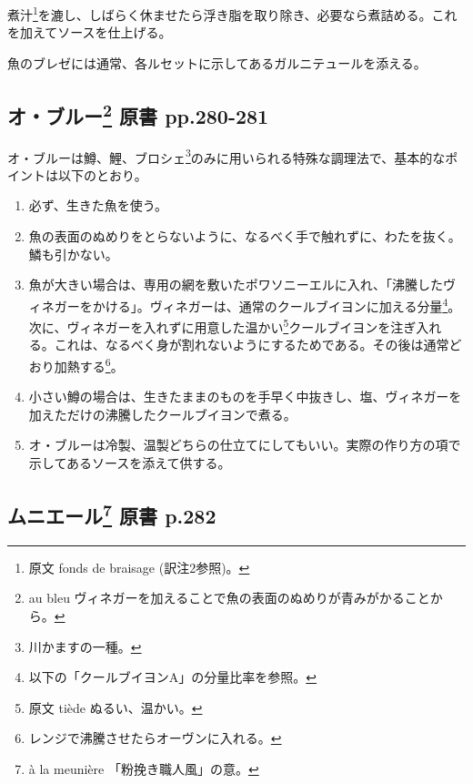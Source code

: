 煮汁\footnote{原文 fonds de braisage (訳注2参照)。}を漉し、しばらく休ませたら浮き脂を取り除き、必要なら煮詰める。これを加えてソースを仕上げる。

魚のブレゼには通常、各ルセットに示してあるガルニテュールを添える。

\hypertarget{ux30aaux30d6ux30ebux30fc36-ux539fux66f8-pp.280-281}{%
\subsection[オ・ブルー 原書
pp.280-281]{\texorpdfstring{オ・ブルー\footnote{au bleu
  ヴィネガーを加えることで魚の表面のぬめりが青みがかることから。} 原書
pp.280-281}{オ・ブルー 原書 pp.280-281}}\label{ux30aaux30d6ux30ebux30fc36-ux539fux66f8-pp.280-281}}

オ・ブルーは鱒、鯉、ブロシェ\footnote{川かますの一種。}のみに用いられる特殊な調理法で、基本的なポイントは以下のとおり。

\begin{enumerate}
\def\labelenumi{\arabic{enumi}.}
\item
  必ず、生きた魚を使う。
\item
  魚の表面のぬめりをとらないように、なるべく手で触れずに、わたを抜く。鱗も引かない。
\item
  魚が大きい場合は、専用の網を敷いたポワソニーエルに入れ、「沸騰したヴィネガーをかける」。ヴィネガーは、通常のクールブイヨンに加える分量\footnote{以下の「クールブイヨンA」の分量比率を参照。}。次に、ヴィネガーを入れずに用意した温かい\footnote{原文
    tiède ぬるい、温かい。}クールブイヨンを注ぎ入れる。これは、なるべく身が割れないようにするためである。その後は通常どおり加熱する\footnote{レンジで沸騰させたらオーヴンに入れる。}。
\item
  小さい鱒の場合は、生きたままのものを手早く中抜きし、塩、ヴィネガーを加えただけの沸騰したクールブイヨンで煮る。
\item
  オ・ブルーは冷製、温製どちらの仕立てにしてもいい。実際の作り方の項で示してあるソースを添えて供する。
\end{enumerate}

\href{欠落アリ}{}

\hypertarget{ux30e0ux30cbux30a8ux30fcux30eb43-ux539fux66f8-p.282}{%
\subsection[ムニエール 原書 p.282]{\texorpdfstring{ムニエール\footnote{à
  la meunière 「粉挽き職人風」の意。} 原書
p.282}{ムニエール 原書 p.282}}\label{ux30e0ux30cbux30a8ux30fcux30eb43-ux539fux66f8-p.282}}

